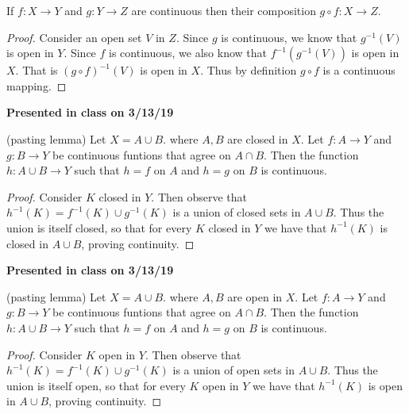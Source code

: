 \documentclass[letter,12pt,twoside]{hmcpset}
\begin{document}
\begin{problem}[Theorem 8.9]
    If $f : X \rightarrow Y$ and $g : Y \rightarrow Z$ are continuous 
    then their composition $g \circ f : X \rightarrow Z$. 
\end{problem}

\begin{proof}
    Consider an open set $V$ in $Z$. Since $g$ is continuous, we know that 
    $g^{-1}(V)$ is open in $Y$. Since $f$ is continuous, we also know that 
    $f^{-1}(g^{-1}(V))$ is open in $X$. That is $(g \circ f)^{-1}(V)$ is 
    open in $X$. Thus by definition $g \circ f$ is a continuous mapping.
\end{proof}
\noindent
\textbf{Presented in class on 3/13/19}

\begin{problem}[Theorem 8.10]
    (pasting lemma) Let $X = A \cup B$. where $A, B$ are closed in $X$. Let
    $f : A \rightarrow Y$ and $g : B \rightarrow Y$ be continuous funtions that 
    agree on $A \cap B$. Then the function $h :A\cup B \rightarrow Y$ 
    such that $h = f$ on $A$ and $h = g$ on $B$ is continuous.
\end{problem}

\begin{proof}
    Consider $K$ closed in $Y$. Then observe that $h^{-1}(K) = f^{-1}(K)
    \cup g^{-1}(K)$ is a union of closed sets in $A \cup B$. Thus 
    the union is itself closed, so that for every $K$ closed in $Y$ 
    we have that $h^{-1}(K)$ is closed in $A\cup B$, proving continuity.    
\end{proof}

\noindent
\textbf{Presented in class on 3/13/19}\\
\begin{problem}[Theorem 8.11]
    (pasting lemma) Let $X = A \cup B$. where $A, B$ are open in $X$. Let
    $f : A \rightarrow Y$ and $g : B \rightarrow Y$ be continuous funtions that 
    agree on $A \cap B$. Then the function $h :A\cup B \rightarrow Y$ 
    such that $h = f$ on $A$ and $h = g$ on $B$ is continuous.
\end{problem}

\begin{proof}
    Consider $K$ open in $Y$. Then observe that $h^{-1}(K) = f^{-1}(K)
    \cup g^{-1}(K)$ is a union of open  sets in $A \cup B$. Thus 
    the union is itself open, so that for every $K$ open in $Y$ we have 
    that 
    $h^{-1}(K)$ is open in $A\cup B$, proving continuity.   
\end{proof}
\end{document}
